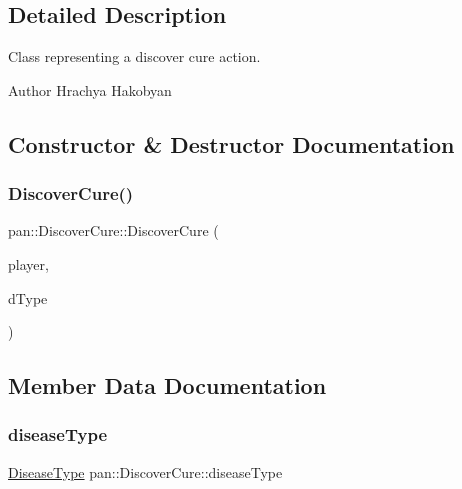 \subsection{Detailed Description}
Class representing a discover cure action. 

\begin{DoxyAuthor}{Author}
Hrachya Hakobyan 
\end{DoxyAuthor}


\subsection{Constructor \& Destructor Documentation}
\mbox{\label{classpan_1_1_discover_cure_a8619beb1af3c6dff42028831762b9dbe}} 
\subsubsection{\texorpdfstring{Discover\+Cure()}{DiscoverCure()}}
{\footnotesize\ttfamily pan\+::\+Discover\+Cure\+::\+Discover\+Cure (\begin{DoxyParamCaption}\item[{\hyperlink{namespacepan_a0cdabf874fbf1bb3a1f0152d108c2909}{Player\+Index}}]{player,  }\item[{\hyperlink{namespacepan_a48851b51b0aef3f0e1be80df5031d9d7}{Disease\+Type}}]{d\+Type }\end{DoxyParamCaption})}



\subsection{Member Data Documentation}
\mbox{\label{classpan_1_1_discover_cure_ac5add4642696af23f73e024dfe1ec520}} 
\subsubsection{\texorpdfstring{disease\+Type}{diseaseType}}
{\footnotesize\ttfamily \hyperlink{namespacepan_a48851b51b0aef3f0e1be80df5031d9d7}{Disease\+Type} pan\+::\+Discover\+Cure\+::disease\+Type}

